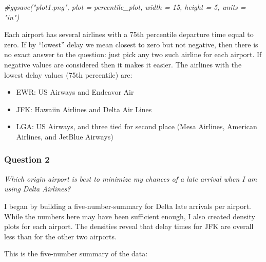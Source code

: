 \documentclass[]{article}
\newenvironment{Shaded}{\begin{snugshade}}{\end{snugshade}}
\newcommand{\CommentTok}[1]{\textcolor[rgb]{0.56,0.35,0.01}{\textit{#1}}}
\providecommand{\tightlist}{%
  \setlength{\itemsep}{0pt}\setlength{\parskip}{0pt}}
\begin{document}
\begin{Shaded}
\begin{Highlighting}[]
\CommentTok{#ggsave("plot1.png", plot = percentile_plot, width = 15, height = 5, units = "in")}
\end{Highlighting}
\end{Shaded}

Each airport has several airlines with a 75th percentile departure time
equal to zero. If by ``lowest'' delay we mean closest to zero but not
negative, then there is no exact answer to the question: just pick any
two such airline for each airport. If negative values are considered
then it makes it easier. The airlines with the lowest delay values (75th
percentile) are:

\begin{itemize}
\tightlist
\item
  EWR: US Airways and Endeavor Air
\item
  JFK: Hawaiin Airlines and Delta Air Lines
\item
  LGA: US Airways, and three tied for second place (Mesa Airlines,
  American Airlines, and JetBlue Airways)
\end{itemize}

\subsubsection{Question 2}\label{question-2}

\emph{Which origin airport is best to minimize my chances of a late
arrival when I am using Delta Airlines?}

I began by building a five-number-summary for Delta late arrivals per
airport. While the numbers here may have been sufficient enough, I also
created density plots for each airport. The densities reveal that delay
times for JFK are overall less than for the other two airports.

This is the five-number summary of the data:
\end{document}
